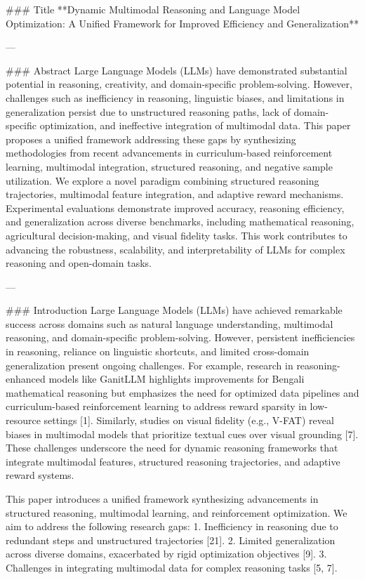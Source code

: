 ### Title
**Dynamic Multimodal Reasoning and Language Model Optimization: A Unified Framework for Improved Efficiency and Generalization**

---

### Abstract
Large Language Models (LLMs) have demonstrated substantial potential in reasoning, creativity, and domain-specific problem-solving. However, challenges such as inefficiency in reasoning, linguistic biases, and limitations in generalization persist due to unstructured reasoning paths, lack of domain-specific optimization, and ineffective integration of multimodal data. This paper proposes a unified framework addressing these gaps by synthesizing methodologies from recent advancements in curriculum-based reinforcement learning, multimodal integration, structured reasoning, and negative sample utilization. We explore a novel paradigm combining structured reasoning trajectories, multimodal feature integration, and adaptive reward mechanisms. Experimental evaluations demonstrate improved accuracy, reasoning efficiency, and generalization across diverse benchmarks, including mathematical reasoning, agricultural decision-making, and visual fidelity tasks. This work contributes to advancing the robustness, scalability, and interpretability of LLMs for complex reasoning and open-domain tasks.

---

### Introduction
Large Language Models (LLMs) have achieved remarkable success across domains such as natural language understanding, multimodal reasoning, and domain-specific problem-solving. However, persistent inefficiencies in reasoning, reliance on linguistic shortcuts, and limited cross-domain generalization present ongoing challenges. For example, research in reasoning-enhanced models like GanitLLM highlights improvements for Bengali mathematical reasoning but emphasizes the need for optimized data pipelines and curriculum-based reinforcement learning to address reward sparsity in low-resource settings [1]. Similarly, studies on visual fidelity (e.g., V-FAT) reveal biases in multimodal models that prioritize textual cues over visual grounding [7]. These challenges underscore the need for dynamic reasoning frameworks that integrate multimodal features, structured reasoning trajectories, and adaptive reward systems.

This paper introduces a unified framework synthesizing advancements in structured reasoning, multimodal learning, and reinforcement optimization. We aim to address the following research gaps:
1. Inefficiency in reasoning due to redundant steps and unstructured trajectories [21].
2. Limited generalization across diverse domains, exacerbated by rigid optimization objectives [9].
3. Challenges in integrating multimodal data for complex reasoning tasks [5, 7].

